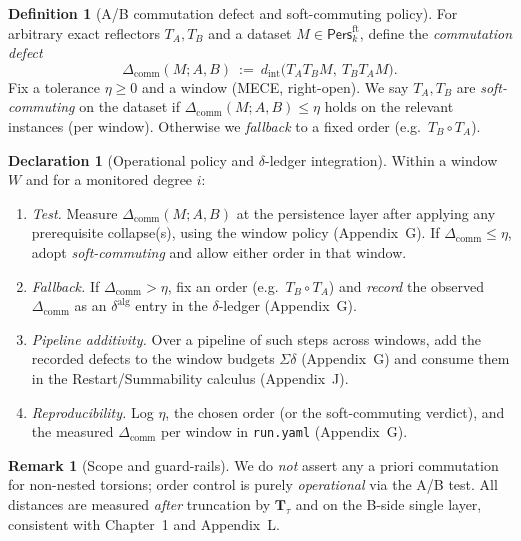 \documentclass[11pt]{article}
\numberwithin{equation}{section}
\theoremstyle{plain}
\theoremstyle{definition}
\theoremstyle{remark}
\DeclareRobustCommand{\hyp}{\nobreakdash-}
\newcommand{\Pers}{\mathsf{Pers}}
\theoremstyle{plain}
\theoremstyle{definition}
\numberwithin{equation}{section}
\theoremstyle{definition}
\newtheorem{definition}[theorem]{Definition}
\newtheorem{remark}[theorem]{Remark}
\newtheorem{declaration}[theorem]{Declaration}
\numberwithin{equation}{section}
\theoremstyle{plain}
\theoremstyle{definition}
\theoremstyle{remark}
\begin{document}
\begin{definition}[A/B commutation defect and soft\hyp commuting policy]\label{K:def:soft}
For arbitrary exact reflectors \(T_A,T_B\) and a dataset \(M\in\Pers^{\mathrm{ft}}_k\), define the \emph{commutation defect}
\[
\Delta_{\mathrm{comm}}(M;A,B)\ :=\ d_{\mathrm{int}}\big(T_AT_BM,\ T_BT_AM\big).
\]
Fix a tolerance \(\eta\ge 0\) and a window (MECE, right\hyp open). We say \(T_A,T_B\) are \emph{soft\hyp commuting} on the dataset if \(\Delta_{\mathrm{comm}}(M;A,B)\le \eta\) holds on the relevant instances (per window). Otherwise we \emph{fallback} to a fixed order (e.g.\ \(T_B\circ T_A\)).
\end{definition}

\begin{declaration}[Operational policy and \(\delta\)\hyp ledger integration]\label{K:dec:soft-policy}
Within a window \(W\) and for a monitored degree \(i\):
\begin{enumerate}\itemsep0.2em
  \item \emph{Test.} Measure \(\Delta_{\mathrm{comm}}(M;A,B)\) at the persistence layer after applying any prerequisite collapse(s), using the window policy (Appendix~G). If \(\Delta_{\mathrm{comm}}\le \eta\), adopt \emph{soft\hyp commuting} and allow either order in that window.
  \item \emph{Fallback.} If \(\Delta_{\mathrm{comm}}>\eta\), fix an order (e.g.\ \(T_B\circ T_A\)) and \emph{record} the observed \(\Delta_{\mathrm{comm}}\) as an \(\delta^{\mathrm{alg}}\) entry in the \(\delta\)\hyp ledger (Appendix~G).
  \item \emph{Pipeline additivity.} Over a pipeline of such steps across windows, add the recorded defects to the window budgets \(\Sigma\delta\) (Appendix~G) and consume them in the Restart/Summability calculus (Appendix~J).
  \item \emph{Reproducibility.} Log \(\eta\), the chosen order (or the soft\hyp commuting verdict), and the measured \(\Delta_{\mathrm{comm}}\) per window in \texttt{run.yaml} (Appendix~G).
\end{enumerate}
\end{declaration}

\begin{remark}[Scope and guard\hyp rails]\label{K:rk:guards}
We do \emph{not} assert any a priori commutation for non\hyp nested torsions; order control is purely \emph{operational} via the A/B test. All distances are measured \emph{after} truncation by \(\mathbf{T}_\tau\) and on the B\hyp side single layer, consistent with Chapter~1 and Appendix~L.
\end{remark}
\end{document}

